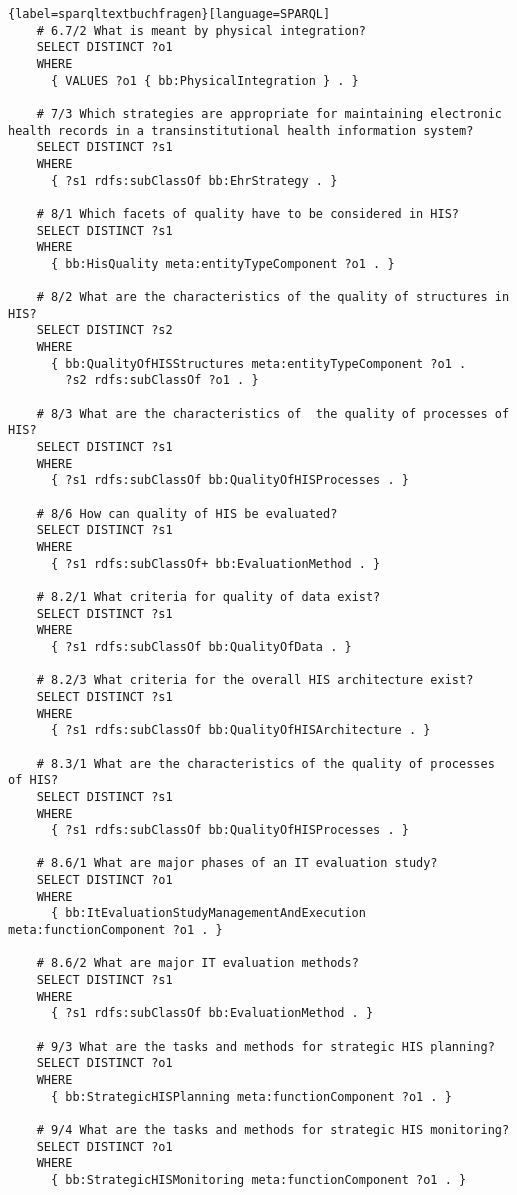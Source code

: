 \begin{lstlisting}{label=sparqltextbuchfragen}[language=SPARQL]
    # 6.7/2 What is meant by physical integration?
    SELECT DISTINCT ?o1
    WHERE
      { VALUES ?o1 { bb:PhysicalIntegration } . }
    
    # 7/3 Which strategies are appropriate for maintaining electronic health records in a transinstitutional health information system?
    SELECT DISTINCT ?s1
    WHERE
      { ?s1 rdfs:subClassOf bb:EhrStrategy . }
    
    # 8/1 Which facets of quality have to be considered in HIS?
    SELECT DISTINCT ?s1
    WHERE
      { bb:HisQuality meta:entityTypeComponent ?o1 . }
    
    # 8/2 What are the characteristics of the quality of structures in HIS?
    SELECT DISTINCT ?s2
    WHERE
      { bb:QualityOfHISStructures meta:entityTypeComponent ?o1 .
        ?s2 rdfs:subClassOf ?o1 . }
    
    # 8/3 What are the characteristics of  the quality of processes of HIS?
    SELECT DISTINCT ?s1
    WHERE
      { ?s1 rdfs:subClassOf bb:QualityOfHISProcesses . }
    
    # 8/6 How can quality of HIS be evaluated?
    SELECT DISTINCT ?s1
    WHERE
      { ?s1 rdfs:subClassOf+ bb:EvaluationMethod . }
    
    # 8.2/1 What criteria for quality of data exist?
    SELECT DISTINCT ?s1
    WHERE
      { ?s1 rdfs:subClassOf bb:QualityOfData . }
    
    # 8.2/3 What criteria for the overall HIS architecture exist?
    SELECT DISTINCT ?s1
    WHERE
      { ?s1 rdfs:subClassOf bb:QualityOfHISArchitecture . }
    
    # 8.3/1 What are the characteristics of the quality of processes of HIS?
    SELECT DISTINCT ?s1
    WHERE
      { ?s1 rdfs:subClassOf bb:QualityOfHISProcesses . }
    
    # 8.6/1 What are major phases of an IT evaluation study?
    SELECT DISTINCT ?o1
    WHERE
      { bb:ItEvaluationStudyManagementAndExecution meta:functionComponent ?o1 . }
    
    # 8.6/2 What are major IT evaluation methods?
    SELECT DISTINCT ?s1
    WHERE
      { ?s1 rdfs:subClassOf bb:EvaluationMethod . }
    
    # 9/3 What are the tasks and methods for strategic HIS planning?
    SELECT DISTINCT ?o1
    WHERE
      { bb:StrategicHISPlanning meta:functionComponent ?o1 . }
    
    # 9/4 What are the tasks and methods for strategic HIS monitoring?
    SELECT DISTINCT ?o1
    WHERE
      { bb:StrategicHISMonitoring meta:functionComponent ?o1 . }
    

\end{lstlisting}
